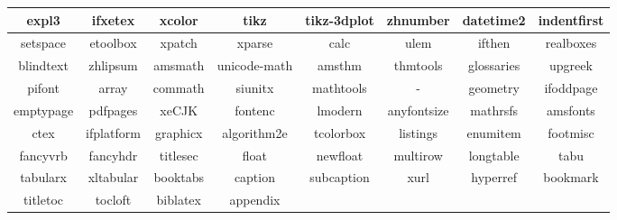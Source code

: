 

\begin{table}[h]
  \begin{tabular}{|c|c|c|c|c|c|c|c|}
  \hline
  expl3     & ifxetex    & xcolor   & tikz        & tikz-3dplot & zhnumber    & datetime2  & indentfirst \\ \hline
  setspace  & etoolbox   & xpatch   & xparse      & calc        & ulem        & ifthen     & realboxes   \\ \hline
  blindtext & zhlipsum   & amsmath  & unicode-math     & amsthm      & thmtools    & glossaries & upgreek     \\ \hline
  pifont    & array      & commath  & siunitx     & mathtools   & -    & geometry   & ifoddpage   \\ \hline
  emptypage & pdfpages   & xeCJK    & fontenc     & lmodern     & anyfontsize & mathrsfs   & amsfonts    \\ \hline
  ctex      & ifplatform & graphicx & algorithm2e & tcolorbox   & listings    & enumitem   & footmisc    \\ \hline
  fancyvrb  & fancyhdr   & titlesec & float       & newfloat    & multirow    & longtable  & tabu        \\ \hline
  tabularx  & xltabular  & booktabs & caption     & subcaption  & xurl        & hyperref   & bookmark    \\ \hline
  titletoc  & tocloft    & biblatex & appendix    &             &             &            &             \\ \hline
  \end{tabular}
\end{table}
